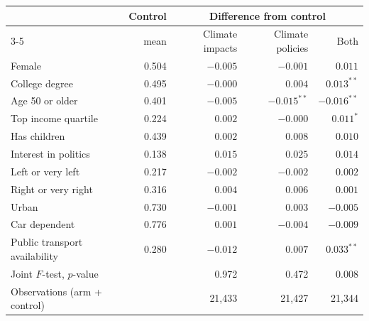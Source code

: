 \begin{tabular}{lrrrr}
\toprule
 & Control & \multicolumn{3}{c}{Difference from control} \\
\cmidrule(lr){3-5}
 & mean & Climate impacts & Climate policies & Both \\
\midrule
Female & 0.504 & $-0.005$ & $-0.001$ & $0.011$ \\
College degree & 0.495 & $-0.000$ & $0.004$ & $0.013^{**}$ \\
Age 50 or older & 0.401 & $-0.005$ & $-0.015^{**}$ & $-0.016^{**}$ \\
Top income quartile & 0.224 & $0.002$ & $-0.000$ & $0.011^{*}$ \\
Has children & 0.439 & $0.002$ & $0.008$ & $0.010$ \\
Interest in politics & 0.138 & $0.015$ & $0.025$ & $0.014$ \\
Left or very left & 0.217 & $-0.002$ & $-0.002$ & $0.002$ \\
Right or very right & 0.316 & $0.004$ & $0.006$ & $0.001$ \\
Urban & 0.730 & $-0.001$ & $0.003$ & $-0.005$ \\
Car dependent & 0.776 & $0.001$ & $-0.004$ & $-0.009$ \\
Public transport availability & 0.280 & $-0.012$ & $0.007$ & $0.033^{**}$ \\
\addlinespace
Joint $F$-test, $p$-value & & 0.972 & 0.472 & 0.008 \\
Observations (arm + control) & & 21,433 & 21,427 & 21,344 \\
\bottomrule
\end{tabular}
